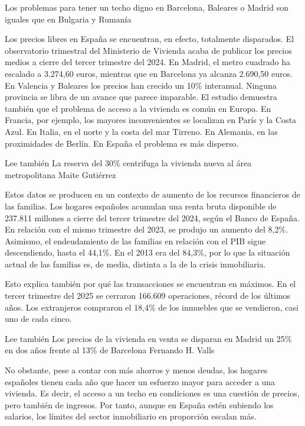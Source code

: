 \documentclass[10pt,a4paper]{article}
\begin{document}
Los problemas para tener un techo digno en Barcelona, Baleares o Madrid son iguales que en Bulgaria y Ruman\'{i}a
\par\medskip
Los precios libres en Espa\~{n}a se encuentran, en efecto, totalmente disparados. El observatorio trimestral del Ministerio de Vivienda acaba de publicar los precios medios a cierre del tercer trimestre del 2024. En Madrid, el metro cuadrado ha escalado a 3.274,60 euros, mientras que en Barcelona ya alcanza 2.690,50 euros. En Valencia y Baleares los precios han crecido un 10\% interanual. Ninguna provincia se libra de un avance que parece imparable. El estudio demuestra tambi\'{e}n que el problema de acceso a la vivienda es com\'{u}n en Europa. En Francia, por ejemplo, los mayores inconvenientes se localizan en Par\'{i}s y la Costa Azul. En Italia, en el norte y la costa del mar Tirreno. En Alemania, en las proximidades de Berl\'{i}n. En Espa\~{n}a el problema es m\'{a}s disperso.
\par\medskip
Lee tambi\'{e}n La reserva del 30\% centrifuga la vivienda nueva al \'{a}rea metropolitana Maite Guti\'{e}rrez
\par\medskip
Estos datos se producen en un contexto de aumento de los recursos financieros de las familias. Los hogares espa\~{n}oles acumulan una renta bruta disponible de 237.811 millones a cierre del tercer trimestre del 2024, seg\'{u}n el Banco de Espa\~{n}a. En relaci\'{o}n con el mismo trimestre del 2023, se produjo un aumento del 8,2\%. Asimismo, el endeudamiento de las familias en relaci\'{o}n con el PIB sigue descendiendo, hasta el 44,1\%. En el 2013 era del 84,3\%, por lo que la situaci\'{o}n actual de las familias es, de media, distinta a la de la crisis inmobiliaria.
\par\medskip
Esto explica tambi\'{e}n por qu\'{e} las transacciones se encuentran en m\'{a}ximos. En el tercer trimestre del 2025 se cerraron 166.609 operaciones, r\'{e}cord de los \'{u}ltimos a\~{n}os. Los extranjeros compraron el 18,4\% de los inmuebles que se vendieron, casi uno de cada cinco.
\par\medskip
Lee tambi\'{e}n Los precios de la vivienda en venta se disparan en Madrid un 25\% en dos a\~{n}os frente al 13\% de Barcelona Fernando H. Valls
\par\medskip
No obstante, pese a contar con m\'{a}s ahorros y menos deudas, los hogares espa\~{n}oles tienen cada a\~{n}o que hacer un esfuerzo mayor para acceder a una vivienda. Es decir, el acceso a un techo en condiciones es una cuesti\'{o}n de precios, pero tambi\'{e}n de ingresos. Por tanto, aunque en Espa\~{n}a est\'{e}n subiendo los salarios, los l\'{i}mites del sector inmobiliario en proporci\'{o}n escalan m\'{a}s.
\end{document}
